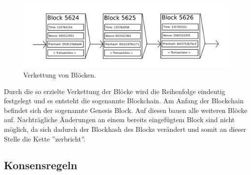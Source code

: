 \begin{figure}[H]
\centering
\includegraphics[width=1\linewidth]{Figures/blockchain_ETH_white_paper}
\decoRule
\caption[Kette von Blöcken]{Verkettung von Blöcken.}
\label{fig:blockchain_ETH_white_paper}
\end{figure}

Durch die so erzielte Verkettung der Blöcke wird die Reihenfolge eindeutig festgelegt und es entsteht die sogenannte Blockchain. Am Anfang der Blockchain befindet sich der sogenannte Genesis Block. Auf diesen bauen alle weiteren Blöcke auf. Nachträgliche Änderungen an einem bereits eingefügtem Block sind nicht möglich, da sich dadurch der Blockhash des Blocks verändert und somit an dieser Stelle die Kette ''zerbricht''.

\subsection{Konsensregeln}

